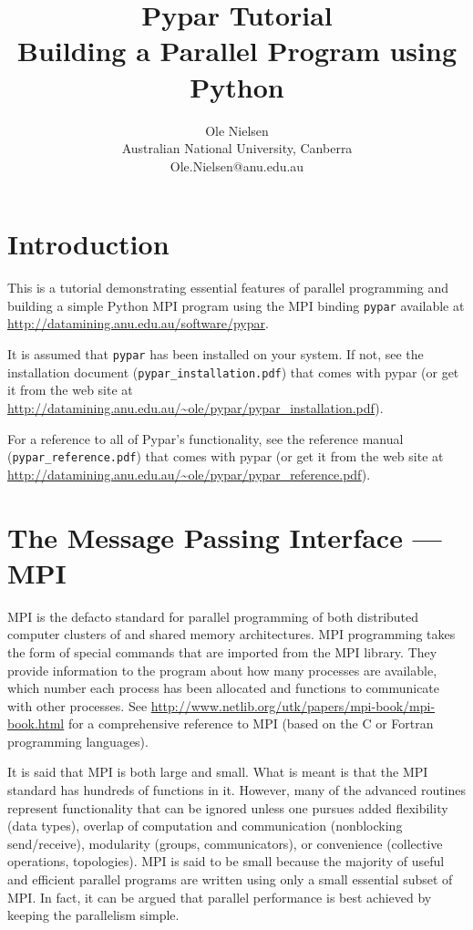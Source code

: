 \documentclass[12pt]{article}
\begin{document}
\title{Pypar Tutorial\\
Building a Parallel Program using Python}


\author{Ole Nielsen \\
Australian National University, Canberra \\
Ole.Nielsen@anu.edu.au}

\maketitle
\section*{Introduction}

This is a tutorial demonstrating essential 
features of parallel programming and building 
a simple Python MPI program using the MPI binding \texttt{pypar} available at
\url{http://datamining.anu.edu.au/software/pypar}.

It is assumed that \texttt{pypar} has been installed on your system.
If not, see the installation document (\texttt{pypar\_installation.pdf}) 
that comes with pypar
(or get it from the web site at 
\url{http://datamining.anu.edu.au/~ole/pypar/pypar_installation.pdf}).

For a reference to all of Pypar's functionality, see the 
reference manual (\texttt{pypar\_reference.pdf}) 
that comes with pypar (or get it from the web site at 
\url{http://datamining.anu.edu.au/~ole/pypar/pypar_reference.pdf}).


\section{The Message Passing Interface --- MPI}
MPI is the defacto standard for parallel programming of both
distributed computer clusters of and shared memory architectures.
MPI programming takes the form of special commands that are
imported from the MPI library. They provide information to the program 
about how many processes are available, which number each process has been 
allocated and functions to communicate with other processes.
See \url{http://www.netlib.org/utk/papers/mpi-book/mpi-book.html} for
a comprehensive reference to MPI (based on 
the C or Fortran programming languages).

It is said that MPI is both large and small. What is meant is that the
MPI standard has hundreds of functions in it. However, many of the
advanced routines represent functionality that can be ignored unless
one pursues added flexibility (data types), overlap of computation and
communication (nonblocking send/receive), modularity (groups,
communicators), or convenience (collective operations, topologies).
MPI is said to be small because the majority of useful and efficient 
parallel programs are written using only a small essential subset of MPI.
In fact, it can be argued that parallel performance is best achieved by 
keeping the parallelism simple. 
\end{document}
